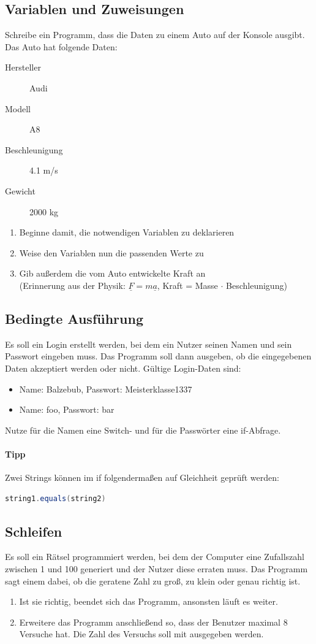 \documentclass[11pt, a4paper]{article}
\renewcommand{\vec}[1]{\underline{#1}}
\begin{document}
\subsection{Variablen und Zuweisungen}
Schreibe ein Programm, dass die Daten zu einem Auto auf der Konsole ausgibt. Das Auto hat folgende Daten:
\begin{description}
	\item[Hersteller] Audi
	\item[Modell] A8
	\item[Beschleunigung] 4.1 m/s
	\item[Gewicht] 2000 kg
\end{description}
\begin{enumerate}
	\item Beginne damit, die notwendigen Variablen zu deklarieren
	\item Weise den Variablen nun die passenden Werte zu
	\item Gib außerdem die vom Auto entwickelte Kraft an \\
	(Erinnerung aus der Physik: $\vec{F}=m\vec{a}$, Kraft = Masse $\cdot$ Beschleunigung)
\end{enumerate}

\subsection{Bedingte Ausführung}
Es soll ein Login erstellt werden, bei dem ein Nutzer seinen Namen und sein Passwort eingeben muss. Das Programm soll dann ausgeben, ob die eingegebenen Daten akzeptiert werden oder nicht. Gültige Login-Daten sind:
\begin{itemize}
	\item Name: Balzebub, Passwort: Meisterklasse1337
	\item Name: foo, Passwort: bar
\end{itemize}
Nutze für die Namen eine Switch- und für die Passwörter eine if-Abfrage.
\paragraph{Tipp} Zwei Strings können im if folgendermaßen auf Gleichheit geprüft werden:
\begin{lstlisting}[language=Java, tabsize=4]
	string1.equals(string2)
\end{lstlisting}

\subsection{Schleifen}
Es soll ein Rätsel programmiert werden, bei dem der Computer eine Zufallszahl zwischen 1 und 100 generiert und der Nutzer diese erraten muss. Das Programm sagt einem dabei, ob die geratene Zahl zu groß, zu klein oder genau richtig ist.
\begin{enumerate}
	\item Ist sie richtig, beendet sich das Programm, ansonsten läuft es weiter.
	\item Erweitere das Programm anschließend so, dass der Benutzer maximal 8 Versuche hat. Die Zahl des Versuchs soll mit ausgegeben werden.
\end{enumerate}
\end{document}
